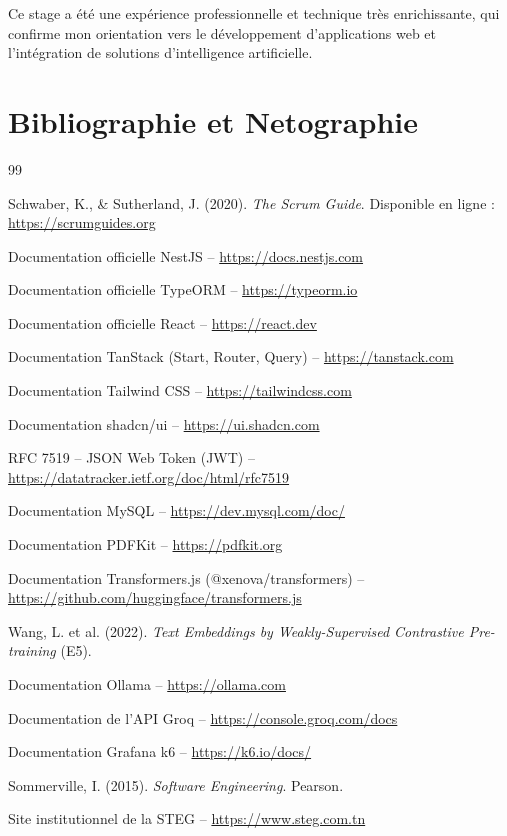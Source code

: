 \documentclass[12pt,a4paper]{report}
\begin{document}
Ce stage a été une expérience professionnelle et technique très enrichissante, qui confirme mon orientation vers le développement d'applications web et l'intégration de solutions d'intelligence artificielle.

\clearpage

\section*{Bibliographie et Netographie}

\begingroup
\renewcommand{\chapter}[2]{}
\begin{thebibliography}{99}

 Schwaber, K., \& Sutherland, J. (2020). \textit{The Scrum Guide}. Disponible en ligne : \url{https://scrumguides.org}

 Documentation officielle NestJS -- \url{https://docs.nestjs.com}

 Documentation officielle TypeORM -- \url{https://typeorm.io}

 Documentation officielle React -- \url{https://react.dev}

 Documentation TanStack (Start, Router, Query) -- \url{https://tanstack.com}

 Documentation Tailwind CSS -- \url{https://tailwindcss.com}

 Documentation shadcn/ui -- \url{https://ui.shadcn.com}

 RFC 7519 -- JSON Web Token (JWT) -- \url{https://datatracker.ietf.org/doc/html/rfc7519}

 Documentation MySQL -- \url{https://dev.mysql.com/doc/}

 Documentation PDFKit -- \url{https://pdfkit.org}

 Documentation Transformers.js (@xenova/transformers) -- \url{https://github.com/huggingface/transformers.js}

 Wang, L. et al. (2022). \textit{Text Embeddings by Weakly-Supervised Contrastive Pre-training} (E5).

 Documentation Ollama -- \url{https://ollama.com}

 Documentation de l'API Groq -- \url{https://console.groq.com/docs}

 Documentation Grafana k6 -- \url{https://k6.io/docs/}

 Sommerville, I. (2015). \textit{Software Engineering}. Pearson.

 Site institutionnel de la STEG -- \url{https://www.steg.com.tn}

\end{thebibliography}
\endgroup
\end{document}

